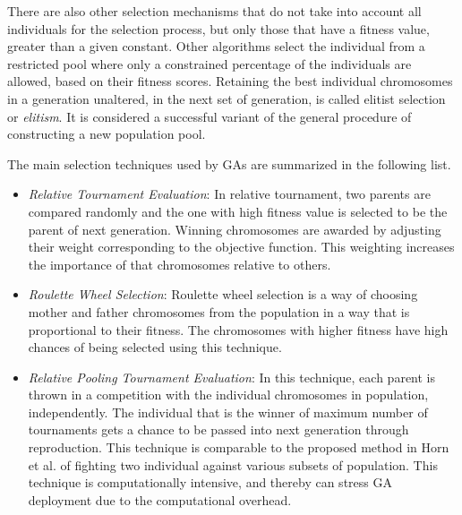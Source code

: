 \documentclass[journal]{IEEEtran}
\begin{document}
There are also other selection mechanisms that do not take into account all individuals for the selection process, but only those that have a fitness value, greater than a given constant. Other algorithms select the individual from a restricted pool where only a constrained percentage of the individuals are allowed, based on their fitness scores. Retaining the best individual chromosomes in a generation unaltered, in the next set of generation, is called elitist selection or \emph{elitism}. It is considered a successful variant of the general procedure of constructing a new population pool.

The main selection techniques used by GAs are summarized in the following list.

\begin{itemize}

\vspace{1mm}
\item \emph{Relative Tournament Evaluation}: In relative tournament, two parents are compared randomly and the one with high fitness value is selected to be the parent of next generation. Winning chromosomes are awarded by adjusting their weight corresponding to the objective function. This weighting increases the importance of that chromosomes relative to others.

\vspace{1mm}
\item \emph{Roulette Wheel Selection}:
Roulette wheel selection is a way of choosing mother and father chromosomes from the population in a way that is proportional to their fitness. The chromosomes with higher fitness have high chances of being selected using this technique.

\vspace{1mm}
\item \emph{Relative Pooling Tournament Evaluation}: In this technique, each parent is thrown in a competition with the individual chromosomes in population, independently. The individual that is the winner of maximum number of tournaments gets a chance to be passed into next generation through  reproduction. This technique is comparable to the proposed method in Horn et al.\cite{horn1994niched} of fighting two individual against various subsets of population. This technique is computationally intensive, and thereby can stress GA deployment due to the computational overhead.



\end{itemize}
\end{document}
